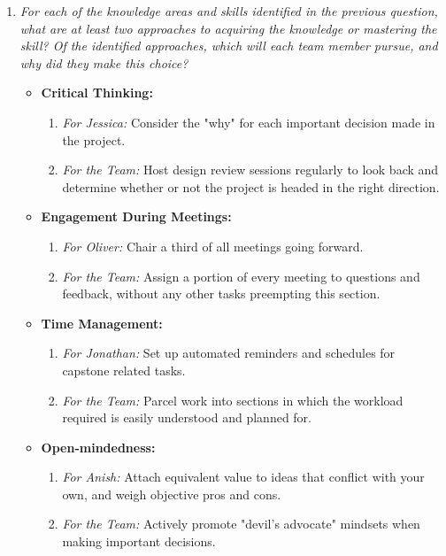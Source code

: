 \documentclass[12pt, titlepage]{article}
\begin{document}
\begin{enumerate}
\begin{enumerate}
  \item \textit{For each of the knowledge areas and skills identified in the previous
          question, what are at least two approaches to acquiring the knowledge or
          mastering the skill?  Of the identified approaches, which will each team
          member pursue, and why did they make this choice?}
        \begin{itemize}
          \item \textbf{Critical Thinking:}
                \begin{enumerate}
                  \item \textit{For Jessica:} Consider the "why" for each important decision made in the project.
                  \item \textit{For the Team:} Host design review sessions regularly to look back and determine whether or not the project is headed in the right direction.
                \end{enumerate}
          \item \textbf{Engagement During Meetings:}
                \begin{enumerate}
                  \item \textit{For Oliver:} Chair a third of all meetings going forward.
                  \item \textit{For the Team:} Assign a portion of every meeting to questions and feedback, without any other tasks preempting this section.
                \end{enumerate}
          \item \textbf{Time Management:}
                \begin{enumerate}
                  \item \textit{For Jonathan:} Set up automated reminders and schedules for capstone related tasks.
                  \item \textit{For the Team:} Parcel work into sections in which the workload required is easily understood and planned for.
                \end{enumerate}
          \item \textbf{Open-mindedness:}
                \begin{enumerate}
                  \item \textit{For Anish:} Attach equivalent value to ideas that conflict with your own, and weigh objective pros and cons.
                  \item \textit{For the Team:} Actively promote "devil's advocate" mindsets when making important decisions.

\end{enumerate}
\end{itemize}
\end{enumerate}
\end{enumerate}
\end{document}
